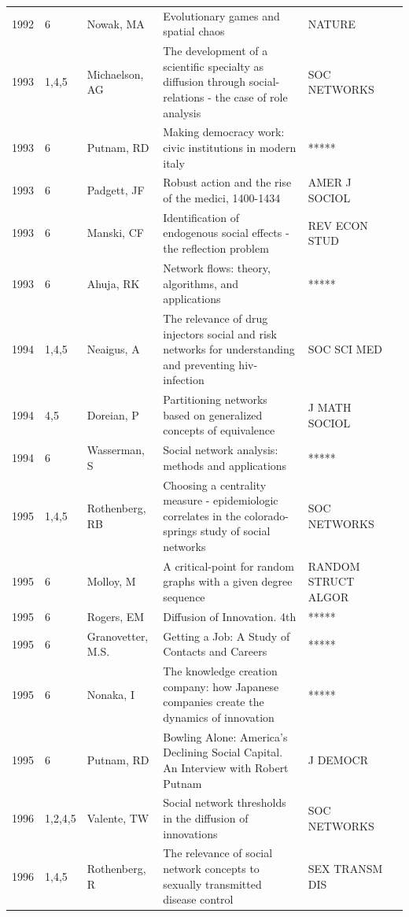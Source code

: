 \documentclass[11pt]{article} %
\begin{document}
\begin{longtable}{p{0.8cm}|p{1.25cm}|p{2.8cm}|p{7.5cm}|p{3cm}l}
1992&	6&	Nowak, MA&	 Evolutionary games and spatial chaos&         	NATURE\\
1993&	1,4,5&	Michaelson, AG&	 The development of a scientific specialty as diffusion through social-relations - the case of role analysis&         	SOC NETWORKS\\
1993&	6&	Putnam, RD&	Making democracy work: civic institutions in modern italy &        	*****\\
1993&	6&	Padgett, JF&	 Robust action and the rise of the medici, 1400-1434&         	AMER J SOCIOL\\
1993&	6&	Manski, CF&	 Identification of endogenous social effects - the reflection problem&         	REV ECON STUD\\
1993&	6&	Ahuja, RK&	 Network flows: theory, algorithms, and applications &         	*****\\
1994&	1,4,5&	Neaigus, A&	 The relevance of drug injectors social and risk networks for understanding and preventing hiv-infection&         	SOC SCI MED\\
1994&	4,5&	Doreian, P&	 Partitioning networks based on generalized concepts of equivalence&         	J MATH SOCIOL\\
1994&	6&	Wasserman, S &	 Social network analysis: methods and applications&         	*****\\
1995&	1,4,5&	Rothenberg, RB&	 Choosing a centrality measure - epidemiologic correlates in the colorado-springs study of social networks&         	SOC NETWORKS\\
1995&	6&	Molloy, M&	 A critical-point for random graphs with a given degree sequence&         	RANDOM STRUCT ALGOR\\
1995&	6&	Rogers, EM&	 Diffusion of Innovation. 4th&         	*****\\
1995&	6&	Granovetter, M.S.&	 Getting a Job: A Study of Contacts and Careers&         	*****\\
1995&	6&	Nonaka, I&	 The knowledge creation company: how Japanese companies create the dynamics of innovation&         	*****\\
1995&	6&	Putnam, RD&	Bowling Alone: America's Declining Social Capital. An Interview with Robert Putnam&         	J DEMOCR\\
1996&	1,2,4,5&	Valente, TW&	 Social network thresholds in the diffusion of innovations&         	SOC NETWORKS\\
1996&	1,4,5&	Rothenberg, R&	 The relevance of social network concepts to sexually transmitted disease control&         	SEX TRANSM DIS\\

\end{longtable}
\end{document}
